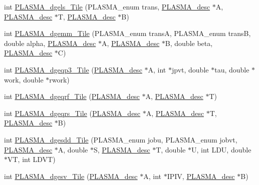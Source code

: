 \begin{DoxyCompactItemize}
\item 
int \hyperlink{group__double__Tile_ga5f8d9376377ea76ed78127e2042123ce_ga5f8d9376377ea76ed78127e2042123ce}{P\+L\+A\+S\+M\+A\+\_\+dgels\+\_\+\+Tile} (P\+L\+A\+S\+M\+A\+\_\+enum trans, \hyperlink{structplasma__desc__t}{P\+L\+A\+S\+M\+A\+\_\+desc} $\ast$A, \hyperlink{structplasma__desc__t}{P\+L\+A\+S\+M\+A\+\_\+desc} $\ast$T, \hyperlink{structplasma__desc__t}{P\+L\+A\+S\+M\+A\+\_\+desc} $\ast$B)
\item 
int \hyperlink{group__double__Tile_ga1d0e5c966a71a00c3bcd613f58ec6edf_ga1d0e5c966a71a00c3bcd613f58ec6edf}{P\+L\+A\+S\+M\+A\+\_\+dgemm\+\_\+\+Tile} (P\+L\+A\+S\+M\+A\+\_\+enum trans\+A, P\+L\+A\+S\+M\+A\+\_\+enum trans\+B, double alpha, \hyperlink{structplasma__desc__t}{P\+L\+A\+S\+M\+A\+\_\+desc} $\ast$A, \hyperlink{structplasma__desc__t}{P\+L\+A\+S\+M\+A\+\_\+desc} $\ast$B, double beta, \hyperlink{structplasma__desc__t}{P\+L\+A\+S\+M\+A\+\_\+desc} $\ast$C)
\item 
int \hyperlink{group__double__Tile_ga37167dcdc82d6b8549bf76bd56201ed1_ga37167dcdc82d6b8549bf76bd56201ed1}{P\+L\+A\+S\+M\+A\+\_\+dgeqp3\+\_\+\+Tile} (\hyperlink{structplasma__desc__t}{P\+L\+A\+S\+M\+A\+\_\+desc} $\ast$A, int $\ast$jpvt, double $\ast$tau, double $\ast$work, double $\ast$rwork)
\item 
int \hyperlink{group__double__Tile_gaf6d09edea44069bd0927b626662f5576_gaf6d09edea44069bd0927b626662f5576}{P\+L\+A\+S\+M\+A\+\_\+dgeqrf\+\_\+\+Tile} (\hyperlink{structplasma__desc__t}{P\+L\+A\+S\+M\+A\+\_\+desc} $\ast$A, \hyperlink{structplasma__desc__t}{P\+L\+A\+S\+M\+A\+\_\+desc} $\ast$T)
\item 
int \hyperlink{group__double__Tile_ga6575f94967997a528918e5c2d4ff43b3_ga6575f94967997a528918e5c2d4ff43b3}{P\+L\+A\+S\+M\+A\+\_\+dgeqrs\+\_\+\+Tile} (\hyperlink{structplasma__desc__t}{P\+L\+A\+S\+M\+A\+\_\+desc} $\ast$A, \hyperlink{structplasma__desc__t}{P\+L\+A\+S\+M\+A\+\_\+desc} $\ast$T, \hyperlink{structplasma__desc__t}{P\+L\+A\+S\+M\+A\+\_\+desc} $\ast$B)
\item 
int \hyperlink{group__double__Tile_ga8ffe3833457bde57382588cdb1bd9f58_ga8ffe3833457bde57382588cdb1bd9f58}{P\+L\+A\+S\+M\+A\+\_\+dgesdd\+\_\+\+Tile} (P\+L\+A\+S\+M\+A\+\_\+enum jobu, P\+L\+A\+S\+M\+A\+\_\+enum jobvt, \hyperlink{structplasma__desc__t}{P\+L\+A\+S\+M\+A\+\_\+desc} $\ast$A, double $\ast$S, \hyperlink{structplasma__desc__t}{P\+L\+A\+S\+M\+A\+\_\+desc} $\ast$T, double $\ast$U, int L\+D\+U, double $\ast$V\+T, int L\+D\+V\+T)
\item 
int \hyperlink{group__double__Tile_gaacf09cca256b82b81087dffa3cabe2d8_gaacf09cca256b82b81087dffa3cabe2d8}{P\+L\+A\+S\+M\+A\+\_\+dgesv\+\_\+\+Tile} (\hyperlink{structplasma__desc__t}{P\+L\+A\+S\+M\+A\+\_\+desc} $\ast$A, int $\ast$I\+P\+I\+V, \hyperlink{structplasma__desc__t}{P\+L\+A\+S\+M\+A\+\_\+desc} $\ast$B)

\end{DoxyCompactItemize}
